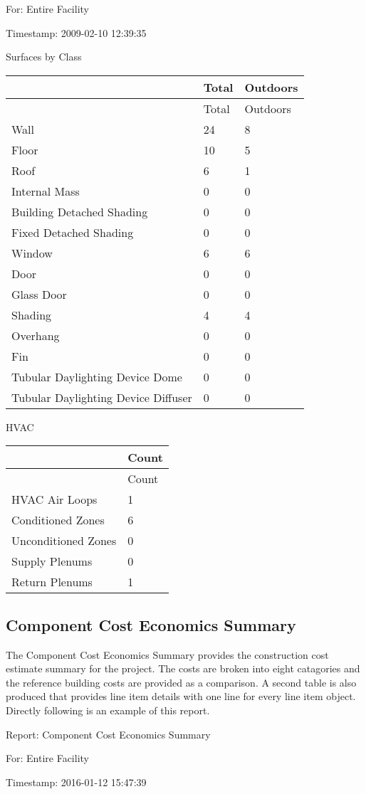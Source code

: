 For: Entire Facility

Timestamp: 2009-02-10 12:39:35

Surfaces by Class

\begin{longtable}[c]{@{}lll@{}}
\toprule 
~ & Total & Outdoors \tabularnewline
\midrule
\endfirsthead

\toprule 
~ & Total & Outdoors \tabularnewline
\midrule
\endhead

Wall & 24 & 8 \tabularnewline
Floor & 10 & 5 \tabularnewline
Roof & 6 & 1 \tabularnewline
Internal Mass & 0 & 0 \tabularnewline
Building Detached Shading & 0 & 0 \tabularnewline
Fixed Detached Shading & 0 & 0 \tabularnewline
Window & 6 & 6 \tabularnewline
Door & 0 & 0 \tabularnewline
Glass Door & 0 & 0 \tabularnewline
Shading & 4 & 4 \tabularnewline
Overhang & 0 & 0 \tabularnewline
Fin & 0 & 0 \tabularnewline
Tubular Daylighting Device Dome & 0 & 0 \tabularnewline
Tubular Daylighting Device Diffuser & 0 & 0 \tabularnewline
\bottomrule
\end{longtable}

HVAC

\begin{longtable}[c]{@{}ll@{}}
\toprule 
~ & Count \tabularnewline
\midrule
\endfirsthead

\toprule 
~ & Count \tabularnewline
\midrule
\endhead

HVAC Air Loops & 1 \tabularnewline
Conditioned Zones & 6 \tabularnewline
Unconditioned Zones & 0 \tabularnewline
Supply Plenums & 0 \tabularnewline
Return Plenums & 1 \tabularnewline
\bottomrule
\end{longtable}

\subsection{Component Cost Economics Summary}\label{component-cost-economics-summary}

The Component Cost Economics Summary provides the construction cost estimate summary for the project. The costs are broken into eight catagories and the reference building costs are provided as a comparison. A second table is also produced that provides line item details with one line for every line item object. Directly following is an example of this report.

Report: Component Cost Economics Summary

For: Entire Facility

Timestamp: 2016-01-12 15:47:39

